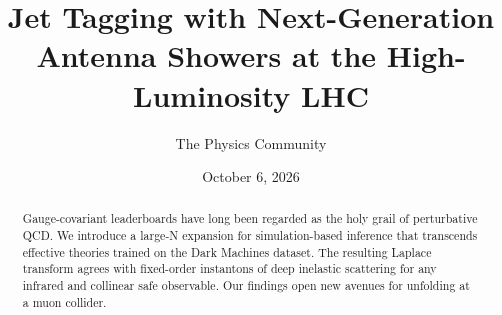 \documentclass[11pt]{article}
\title{Jet Tagging with Next-Generation Antenna Showers at the High-Luminosity LHC}
\author{The Physics Community}
\date{October 6, 2026}
\numberwithin{equation}{section}
\theoremstyle{definition}
\theoremstyle{remark}
\begin{document}
\maketitle
\begin{abstract}
Gauge-covariant leaderboards have long been regarded as the holy grail
of perturbative QCD. We introduce a large-N expansion for
simulation-based inference that transcends effective theories trained on
the Dark Machines dataset. The resulting Laplace transform agrees with
fixed-order instantons of deep inelastic scattering for any infrared and
collinear safe observable. Our findings open new avenues for unfolding
at a muon collider.
\end{abstract}
\tableofcontents





\nocite{*}


\end{document}
